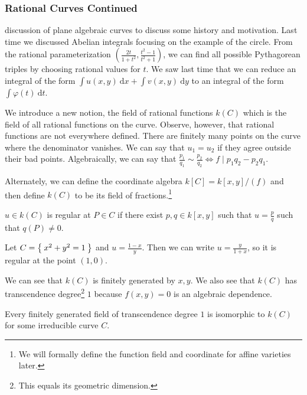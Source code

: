 \documentclass[twoside, 10pt]{article}
\renewcommand{\d}{\ \mathrm{d}}
\begin{document}
    \subsubsection{Rational Curves Continued}%
    discussion of plane algebraic curves to discuss some history and
    motivation. Last time we discussed Abelian integrals focusing on the
    example of the circle. From the rational parameterization $\left(
    \frac{2t}{1+t^2}, \frac{t^2-1}{t^2+1} \right)$, we can find all possible
    Pythagorean triples by choosing rational values for $t$. We saw last time
    that we can reduce an integral of the form $\int u(x,y) \d x + \int v(x,y)
    \d y$ to an integral of the form $\int \varphi(t) \d t$. 

    We introduce a new notion, the field of rational functions $k(C)$ which is
    the field of all rational functions on the curve. Observe, however, that
    rational functions are not everywhere defined. There are finitely many
    points on the curve where the denominator vanishes. We can say that $u_1 =
    u_2$ if they agree outside their bad points. Algebraically, we can say that
    $\frac{p_1}{q_1} \sim \frac{p_2}{q_2} \Leftrightarrow f \mid
    p_1q_2-p_2q_1$. 

    Alternately, we can define the coordinate algebra $k[C] = k[x,y]/(f)$ and
    then define $k(C)$ to be its field of fractions.\footnote{We will formally
    define the function field and coordinate for affine varieties later.}

    \begin{defn} $u \in k(C)$ is regular at $P \in C$ if
    there exist $p,q \in k[x,y]$ such that $u=\frac{p}{q}$ such that $q(P) \neq
0$.  \end{defn}

    \begin{exm} Let $C = \Set{x^2+y^2=1}$ and $u = \frac{1-x}{y}$. Then we can
    write $u = \frac{y}{1+x}$, so it is regular at the point $(1,0)$.
\end{exm}

    We can see that $k(C)$ is finitely generated by $x,y$. We also see that
    $k(C)$ has transcendence degree\footnote{This equals its geometric
    dimension.} $1$ because $f(x,y) = 0$ is an algebraic dependence. 

    \begin{lem} Every finitely generated field of transcendence degree $1$ is
    isomorphic to $k(C)$ for some irreducible curve $C$.  \end{lem}
\end{document}
